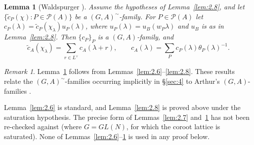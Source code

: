 \documentclass[12pt,letterpaper]{article}
\numberwithin{equation}{section}
\theoremstyle{plain}
\newtheorem{lemma}{Lemma}[section]
\theoremstyle{remark}
\newtheorem{remarkold}{Remark}%
\theoremstyle{plain}
\theoremstyle{definition}
\theoremstyle{remark}
\theoremstyle{remark}
\newcommand{\cP}{\mathcal{P}}
\begin{document}
\begin{lemma}[Waldspurger {\cite[\S7]{Wa89a}}]\label{lem:2.9}
Assume the hypotheses of Lemma~\ref{lem:2.8}, and let $\{\tilde c_P(\chi):P\in\cP(A)\}$ be a $(G,A)^\sim$-family. For $P\in\cP(A)$ let $c_P(\lambda)=\tilde c_P(\chi_{\lambda})u_P(\lambda)$, where $u_P(\lambda)=u_B(w_P\lambda)$ and $u_B$ is as in Lemma~\ref{lem:2.8}. Then $\{c_P\}_P$ is a $(G,A)$-family, and
\[
\tilde c_A(\chi_\lambda)=\sum_{r\in L^\vee}c_A(\lambda+r),\qquad c_A(\lambda)=\sum_{P}c_P(\lambda)\theta_P(\lambda)^{-1}.
\]
\end{lemma}

\begin{remarkold}\label{rem:2}
Lemma~\ref{lem:2.9} follows from Lemmas~\ref{lem:2.6}--\ref{lem:2.8}. These results relate the $(G,A)^\sim$-families occurring implicitly in \S\ref{sec:4} to Arthur's $(G,A)$-families \cite{Ar81}.
\end{remarkold}

\begin{rem26}[\S\ref{sec:2.5}]
Lemma~\ref{lem:2.6} is standard, and Lemma~\ref{lem:2.8} is proved above under the saturation hypothesis. The precise form of Lemmas~\ref{lem:2.7} and~\ref{lem:2.9} has not been re-checked against \cite[\S7]{Wa89a} (where $G=GL(N)$, for which the coroot lattice is saturated). None of Lemmas~\ref{lem:2.6}--\ref{lem:2.9} is used in any proof below.
\end{rem26}
\end{document}
